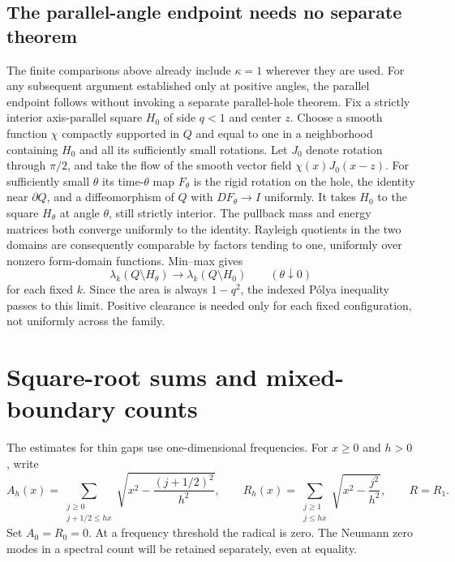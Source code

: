 \documentclass[11pt,reqno]{amsart}
\numberwithin{equation}{section}
\begin{document}
\subsection{The parallel-angle endpoint needs no separate theorem}
\label{rot:zero-angle}
\label{rot:parallel-limit}

The finite comparisons above already include $\kappa=1$ wherever they
are used. For any subsequent argument established only at positive
angles, the parallel endpoint follows without invoking a separate
parallel-hole theorem. Fix a strictly interior axis-parallel square
$H_0$ of side $q<1$ and center $z$. Choose a smooth function $\chi$
compactly supported in $Q$ and equal to one in a neighborhood containing
$H_0$ and all its sufficiently small rotations. Let $J_0$ denote
rotation through $\pi/2$, and take the flow of the smooth vector field
$\chi(x)J_0(x-z)$. For sufficiently small $\theta$ its time-$\theta$
map $F_\theta$ is the rigid rotation on the hole, the identity near
$\partial Q$, and a diffeomorphism of $Q$ with
$DF_\theta\to I$ uniformly. It takes $H_0$ to the square $H_\theta$
at angle $\theta$, still strictly interior. The pullback mass and
energy matrices both converge uniformly to the identity. Rayleigh
quotients in the two domains are consequently comparable by factors
tending to one, uniformly over nonzero form-domain functions.
Min--max gives
\[
 \lambda_k(Q\setminus H_\theta)
        \longrightarrow\lambda_k(Q\setminus H_0)
        \qquad(\theta\downarrow0)
\]
for each fixed $k$. Since the area is always $1-q^2$, the indexed
P\'olya inequality passes to this limit. Positive clearance is needed
only for each fixed configuration, not uniformly across the family.

\section{Square-root sums and mixed-boundary counts}\label{sec:sums}

The estimates for thin gaps use one-dimensional frequencies.
For $x\ge0$ and $h>0$, write
\begin{equation}\label{eq:rect-width-sums}
 A_h(x)=\sum_{\substack{j\ge0\\j+1/2\le hx}}
    \sqrt{x^2-\frac{(j+1/2)^2}{h^2}},\qquad
 R_h(x)=\sum_{\substack{j\ge1\\j\le hx}}
    \sqrt{x^2-\frac{j^2}{h^2}},\qquad R=R_1.
\end{equation}
Set $A_0=R_0=0$. At a frequency threshold the radical is
zero. The Neumann zero modes in a spectral count will be
retained separately, even at equality.
\end{document}
